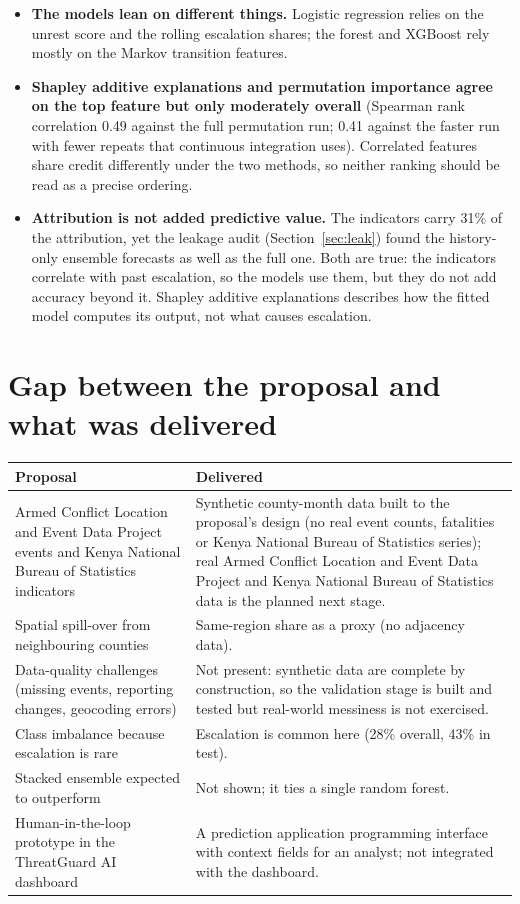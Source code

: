\documentclass[11pt,a4paper]{article}
\begin{document}
\begin{itemize}
  \item \textbf{The models lean on different things.} Logistic regression relies on the unrest score and the rolling escalation shares; the forest and XGBoost rely mostly on the Markov transition features.
  \item \textbf{Shapley additive explanations and permutation importance agree on the top feature but only moderately overall} (Spearman rank correlation 0.49 against the full permutation run; 0.41 against the faster run with fewer repeats that continuous integration uses). Correlated features share credit differently under the two methods, so neither ranking should be read as a precise ordering.
  \item \textbf{Attribution is not added predictive value.} The indicators carry 31\% of the attribution, yet the leakage audit (Section~\ref{sec:leak}) found the history-only ensemble forecasts as well as the full one. Both are true: the indicators correlate with past escalation, so the models use them, but they do not add accuracy beyond it.
  Shapley additive explanations describes how the fitted model computes its output, not what causes escalation.
\end{itemize}

\section{Gap between the proposal and what was delivered}
\begin{longtable}{@{}>{\raggedright\arraybackslash}p{5.6cm}>{\raggedright\arraybackslash}p{10.0cm}@{}}
\toprule
\textbf{Proposal} & \textbf{Delivered} \\
\midrule
\endhead
Armed Conflict Location and Event Data Project events and Kenya National Bureau of Statistics indicators & Synthetic county-month data built to the proposal's design (no real event counts, fatalities or Kenya National Bureau of Statistics series); real Armed Conflict Location and Event Data Project and Kenya National Bureau of Statistics data is the planned next stage. \\
Spatial spill-over from neighbouring counties & Same-region share as a proxy (no adjacency data). \\
Data-quality challenges (missing events, reporting changes, geocoding errors) & Not present: synthetic data are complete by construction, so the validation stage is built and tested but real-world messiness is not exercised. \\
Class imbalance because escalation is rare & Escalation is common here (28\% overall, 43\% in test). \\
Stacked ensemble expected to outperform & Not shown; it ties a single random forest. \\
Human-in-the-loop prototype in the ThreatGuard AI dashboard & A prediction application programming interface with context fields for an analyst; not integrated with the dashboard. \\
\bottomrule
\end{longtable}
\end{document}
